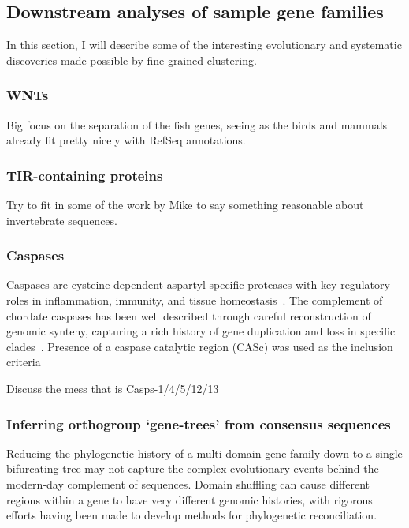 \documentclass[twocolumn]{bmcart}  %
\begin{document}
\subsection{Downstream analyses of sample gene families}\label{subsec:downstreamAnalysesOfSampleGeneFamilies}
In this section, I will describe some of the interesting evolutionary and systematic discoveries made possible by fine-grained clustering.


\subsubsection{WNTs}
Big focus on the separation of the fish genes, seeing as the birds and mammals already fit pretty nicely with RefSeq annotations.


\subsubsection{TIR-containing proteins}
Try to fit in some of the work by Mike to say something reasonable about invertebrate sequences.


\subsubsection{Caspases}
Caspases are cysteine-dependent aspartyl-specific proteases with key regulatory roles in inflammation, immunity, and tissue homeostasis~\cite{Songane:2018kq,McIlwain:2013iy}.
The complement of chordate caspases has been well described through careful reconstruction of genomic synteny, capturing a rich history of gene duplication and loss in specific clades~\cite{Eckhart:2008gv,Sakamaki:2009fu,Sakamaki:2015kb,Sakata:2007bs}.
Presence of a caspase catalytic region (CASc) was used as the inclusion criteria

Discuss the mess that is Casps-1/4/5/12/13


\subsubsection{Inferring orthogroup `gene-trees' from consensus sequences}
Reducing the phylogenetic history of a multi-domain gene family down to a single bifurcating tree may not capture the complex evolutionary events behind the modern-day complement of sequences.
Domain shuffling can cause different regions within a gene to have very different genomic histories, with rigorous efforts having been made to develop methods for phylogenetic reconciliation.
\end{document}

